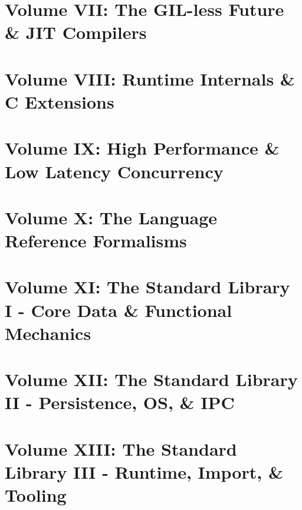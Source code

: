 \documentclass[11pt, a4paper, openany]{book}
\begin{document}
\part{Volume VII: The GIL-less Future \& JIT Compilers}



\part{Volume VIII: Runtime Internals \& C Extensions}



\part{Volume IX: High Performance \& Low Latency Concurrency}





\part{Volume X: The Language Reference Formalisms}


\part{Volume XI: The Standard Library I - Core Data \& Functional Mechanics}



\part{Volume XII: The Standard Library II - Persistence, OS, \& IPC}



\part{Volume XIII: The Standard Library III - Runtime, Import, \& Tooling}



\end{document}
